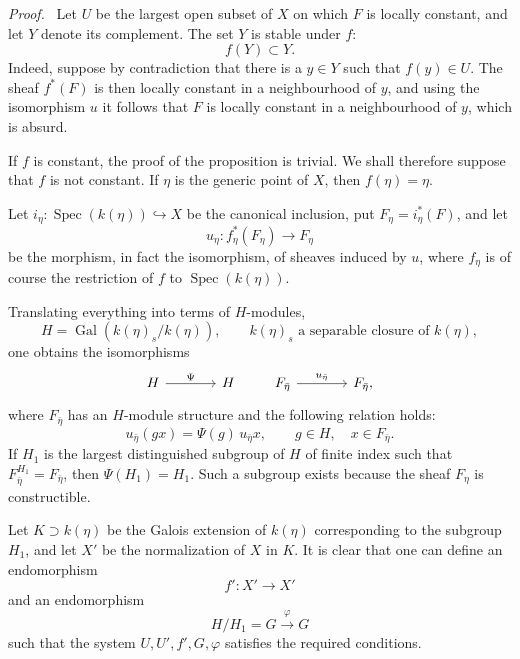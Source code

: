 \documentclass[11pt]{article}
\newenvironment{prooftext}[1][Proof]{\par\noindent\emph{#1.}\ }{\par\medskip}
\DeclareMathOperator{\Spec}{Spec}
\providecommand{\Gal}{\operatorname{Gal}}
\providecommand{\Spec}{\operatorname{Spec}}
\providecommand{\Spec}{\operatorname{Spec}}
\providecommand{\Spec}{\operatorname{Spec}}
\providecommand{\Spec}{\operatorname{Spec}}
\providecommand{\Gal}{\operatorname{Gal}}
\begin{document}
\begin{prooftext}[Proof]
Let $U$ be the largest open subset of $X$ on which $F$ is locally constant, and let $Y$ denote its complement. The set $Y$ is stable under $f$:
\[
f(Y)\subset Y.
\]
Indeed, suppose by contradiction that there is a $y\in Y$ such that $f(y)\in U$. The sheaf $f^*(F)$ is then locally constant in a neighbourhood of $y$, and using the isomorphism $u$ it follows that $F$ is locally constant in a neighbourhood of $y$, which is absurd.

If $f$ is constant, the proof of the proposition is trivial. We shall therefore suppose that $f$ is not constant. If $\eta$ is the generic point of $X$, then $f(\eta)=\eta$.

Let $i_\eta:\Spec(k(\eta))\hookrightarrow X$ be the canonical inclusion, put $F_\eta=i_\eta^*(F)$, and let
\[
u_\eta:f_\eta^*(F_\eta)\longrightarrow F_\eta
\]
be the morphism, in fact the isomorphism, of sheaves induced by $u$, where $f_\eta$ is of course the restriction of $f$ to $\Spec(k(\eta))$.

Translating everything into terms of $H$-modules,
\[
H=\Gal(k(\eta)_s/k(\eta)),\qquad k(\eta)_s\text{ a separable closure of }k(\eta),
\]
one obtains the isomorphisms
\[
\begin{tikzcd}[column sep=large]
H \arrow[r,"\Psi"] & H
\end{tikzcd}
\qquad
\begin{tikzcd}[column sep=large]
F_{\bar\eta} \arrow[r,"u_{\bar\eta}"] & F_{\bar\eta},
\end{tikzcd}
\]
where $F_{\bar\eta}$ has an $H$-module structure and the following relation holds:
\[
u_{\bar\eta}(gx)=\Psi(g)\,u_{\bar\eta}x,
\qquad g\in H,
\quad x\in F_{\bar\eta}.
\]
If $H_1$ is the largest distinguished subgroup of $H$ of finite index such that $F_{\bar\eta}^{H_1}=F_{\bar\eta}$, then $\Psi(H_1)=H_1$. Such a subgroup exists because the sheaf $F_\eta$ is constructible.

Let $K\supset k(\eta)$ be the Galois extension of $k(\eta)$ corresponding to the subgroup $H_1$, and let $X'$ be the normalization of $X$ in $K$. It is clear that one can define an endomorphism
\[
f':X'\longrightarrow X'
\]
and an endomorphism
\[
H/H_1=G\xrightarrow{\varphi}G
\]
such that the system $U,U',f',G,\varphi$ satisfies the required conditions.
\end{prooftext}
\end{document}
